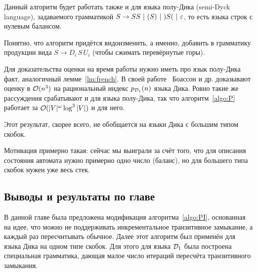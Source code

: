 \begin{note}
  Данный алгоритм будет работать также и для языка полу-Дика (semi-Dyck language), задаваемого грамматикой $S \rightarrow SS ~|~ ( S ) ~|~ ) S ( ~|~ \varepsilon$, то есть языка строк с нулевым балансом.

  Понятно, что алгоритм придётся видоизменить, а именно, добавить в грамматику продукции вида $S \to D_i\, S\, U_i$ (чтобы сжимать перевёрнутые горы). 

  Для доказательства оценки на время работы нужно иметь про язык полу-Дика факт, аналогичный лемме~\ref{lm:french}. В своей работе~\cite{Boasson1981} Боассон и др. доказывают оценку в $\mathcal{O}(n^3)$ на рациональный индекс $p_{\mathcal{D}_1}(n)$ языка Дика. Ровно такие же рассуждения срабатывают и для языка полу-Дика, так что алгоритм~\ref{algo:P} работает за $\mathcal{O}(|V|^{\omega} \log^3 |V|)$ и для него.
\end{note}

\begin{note}
  Этот результат, скорее всего, не обобщается на языки Дика с большим типом скобок. 

  Мотивация примерно такая: сейчас мы выиграли за счёт того, что для описания состояния автомата нужно примерно одно число (баланс), но для большего типа скобок нужен уже весь стек.
\end{note}

\subsection{Выводы и результаты по главе}

В данной главе была предложена модификация алгоритма~\ref{algo:PI}, основанная на идее, что можно не поддерживать инкрементальное транзитивное замыкание, а каждый раз пересчитывать обычное. Далее этот алгоритм был применён для языка Дика на одном типе скобок. Для этого для языка $\mathcal{D}_1$ была построена специальная грамматика, дающая малое число итераций пересчёта транзитивного замыкания.
